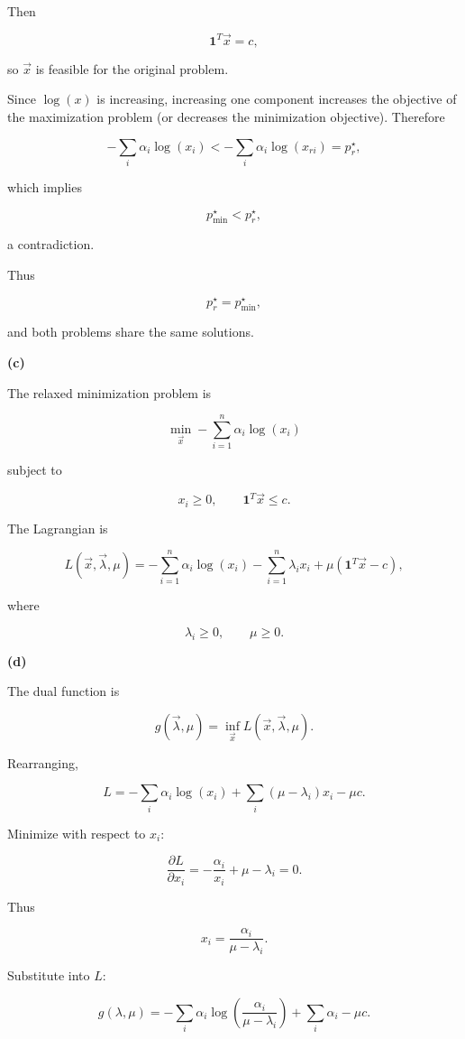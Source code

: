 \documentclass[
	12pt,
]{fphw}
\begin{document}
Then

\[
\mathbf{1}^T\vec{x} = c,
\]

so $\vec{x}$ is feasible for the original problem.

Since $\log(x)$ is increasing, increasing one component increases the objective of the maximization problem (or decreases the minimization objective). Therefore

\[
-\sum_i \alpha_i\log(x_i) < -\sum_i \alpha_i\log(x_{ri}) = p_r^\star,
\]

which implies

\[
p_{\min}^\star < p_r^\star,
\]

a contradiction.

Thus

\[
p_r^\star = p_{\min}^\star,
\]

and both problems share the same solutions.

\bigskip

\textbf{(c)}

The relaxed minimization problem is

\[
\min_{\vec{x}} -\sum_{i=1}^n \alpha_i\log(x_i)
\]

subject to

\[
x_i \ge 0, \qquad \mathbf{1}^T\vec{x} \le c.
\]

The Lagrangian is

\[
L(\vec{x},\vec{\lambda},\mu)
=
-\sum_{i=1}^n \alpha_i\log(x_i)
-
\sum_{i=1}^n \lambda_i x_i
+
\mu(\mathbf{1}^T\vec{x}-c),
\]

where

\[
\lambda_i \ge 0, \qquad \mu \ge 0.
\]

\bigskip

\textbf{(d)}

The dual function is

\[
g(\vec{\lambda},\mu)
=
\inf_{\vec{x}} L(\vec{x},\vec{\lambda},\mu).
\]

Rearranging,

\[
L
=
-\sum_i \alpha_i\log(x_i)
+
\sum_i (\mu-\lambda_i)x_i
-
\mu c.
\]

Minimize with respect to $x_i$:

\[
\frac{\partial L}{\partial x_i}
=
-\frac{\alpha_i}{x_i} + \mu - \lambda_i = 0.
\]

Thus

\[
x_i = \frac{\alpha_i}{\mu - \lambda_i}.
\]

Substitute into $L$:

\[
g(\lambda,\mu)
=
-\sum_i \alpha_i\log\!\left(\frac{\alpha_i}{\mu-\lambda_i}\right)
+
\sum_i \alpha_i
-
\mu c.
\]
\end{document}
